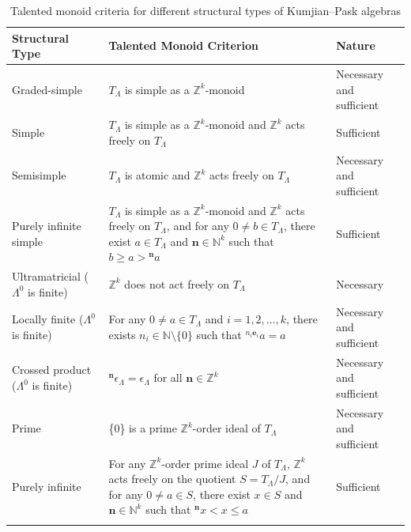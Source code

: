 \documentclass[a4paper,reqno,12pt]{amsart}
\numberwithin{equation}{section}
\theoremstyle{definition}
\theoremstyle{remark}
\begin{document}
\begin{table}[htbp]
    \centering
    \small %
    \begin{tabularx}{\textwidth}{
        >{\hsize=1.1\hsize\raggedright\arraybackslash}X 
        >{\hsize=1.4\hsize\raggedright\arraybackslash}X 
        >{\hsize=0.5\hsize\raggedright\arraybackslash}X
    }
        \toprule
        \textbf{Structural Type} & \textbf{Talented Monoid Criterion} & \textbf{Nature} \\
        \midrule
        \midrule
        Graded-simple & $T_\Lambda$ is simple as a $\mathbb{Z}^k$-monoid & Necessary and sufficient \\
        \addlinespace
        Simple & $T_\Lambda$ is simple as a $\mathbb{Z}^k$-monoid and $\mathbb{Z}^k$ acts freely on $T_\Lambda$ & Sufficient \\
        \addlinespace
        Semisimple & $T_\Lambda$ is atomic and $\mathbb{Z}^k$ acts freely on $T_\Lambda$ & Necessary and sufficient \\
        \addlinespace
        Purely infinite simple & $T_\Lambda$ is simple as a $\mathbb{Z}^k$-monoid and $\mathbb{Z}^k$ acts freely on $T_\Lambda$, and for any $0\neq b\in T_\Lambda$, there exist $a\in T_\Lambda$ and $\mathbf{n}\in \mathbb{N}^k$ such that $b\ge a > {}^{\mathbf{n}}a$ & Sufficient \\
        \addlinespace
        Ultramatricial ($\Lambda^0$ is finite) & $\mathbb{Z}^k$ does not act freely on $T_\Lambda$ & Necessary \\
        \addlinespace
        Locally finite ($\Lambda^0$ is finite) & For any $0\neq a\in T_\Lambda$ and $i=1,2,\ldots,k$, there exists $n_i\in \mathbb{N}\setminus \{0\}$ such that ${}^{n_i\mathbf{e}_i}a=a$ & Necessary and sufficient \\
        \addlinespace
        Crossed product ($\Lambda^0$ is finite) & ${}^{\mathbf{n}} \epsilon_\Lambda=\epsilon_\Lambda$ for all $\mathbf{n}\in \mathbb{Z}^k$ & Necessary and sufficient \\
        \addlinespace
        Prime & \{0\} is a prime $\mathbb{Z}^k$-order ideal of $T_\Lambda$ & Necessary and sufficient\\
        \addlinespace
        Purely infinite & For any $\mathbb{Z}^k$-order prime ideal $J$ of $T_\Lambda$, $\mathbb{Z}^k$ acts freely on the quotient $S=T_\Lambda/J$, and for any $0\neq a\in S$, there exist $x\in S$ and $\mathbf{n}\in \mathbb{N}^k$ such that ${}^{\mathbf{n}}x < x \le a$ & Sufficient \\
        \addlinespace
        \bottomrule
    \end{tabularx}
\vspace{0.15cm}
\caption{Talented monoid criteria for different structural types of Kumjian--Pask algebras}
    \label{tab:kp_algebras_criteria}
\end{table}
\end{document}
